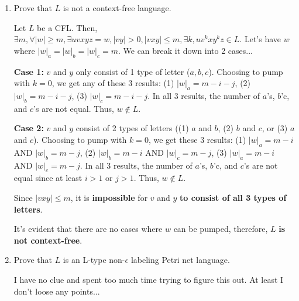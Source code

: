 \documentclass[12pt]{article}
\begin{document}
\begin{enumerate}
\begin{enumerate}[label=(\alph*)]

    
    \item Prove that $L$ is not a context-free language.

    \color{blue}
        Let $L$ be a CFL. Then, $\exists m, \forall |w| \geq m, \exists uvxyz = w, |vy| > 0, |vxy| \leq m, \exists k, uv^kxy^kz \in L$. Let's have $w$ where $|w|_a = |w|_b = |w|_c = m$. We can break it down into 2 cases...

        \textbf{Case 1:} $v$ and $y$ only consist of 1 type of letter ($a, b, c$). Choosing to pump with $k = 0$, we get any of these 3 results: (1) $|w|_a = m-i-j$, (2) $|w|_b = m-i-j$, (3) $|w|_c = m-i-j$. In all 3 results, the number of $a$'s, $b$'c, and $c$'s are not equal. Thus, $w \notin L$.

        \textbf{Case 2:} $v$ and $y$ consist of 2 types of letters ((1) $a$ and $b$, (2) $b$ and $c$, or (3) $a$ and $c$). Choosing to pump with $k = 0$, we get these 3 results: (1) $|w|_a = m-i$ AND $|w|_b = m-j$, (2) $|w|_b = m-i$ AND $|w|_c = m-j$, (3) $|w|_a = m-i$ AND $|w|_c = m-j$. In all 3 results, the number of $a$'s, $b$'c, and $c$'s are not equal since at least $i > 1$ or $j > 1$. Thus, $w \notin L$.

        Since $|vxy| \leq m$, it is \textbf{impossible} for $v$ and $y$ \textbf{to consist of all 3 types of letters}.

        It's evident that there are no cases where $w$ can be pumped, therefore, $L$ \textbf{is not context-free}.
    \color{black}


    
    \item Prove that $L$ is an L-type non-$\epsilon$ labeling Petri net language.

    \color{red}
        I have no clue and spent too much time trying to figure this out. At least I don't loose any points...
    \color{black}


    

\end{enumerate}
\end{enumerate}
\end{document}
